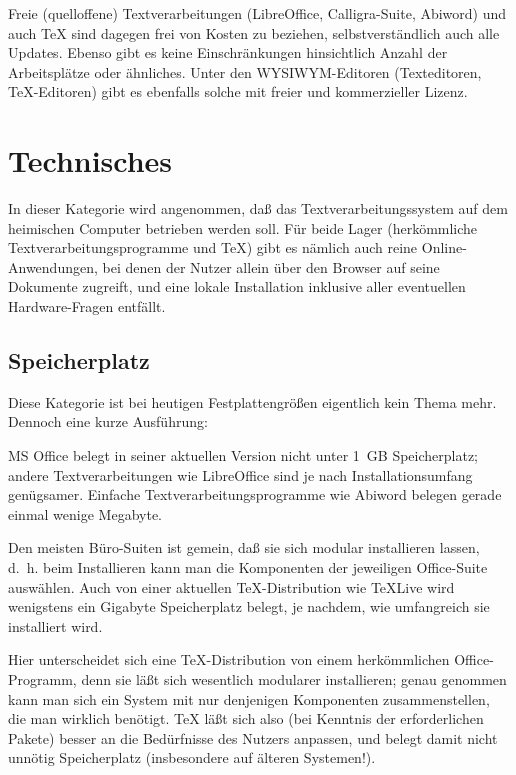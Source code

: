 \documentclass[11pt,a4paper,ngerman,DIV=8]{scrartcl}
\begin{document}
Freie (quelloffene) Textverarbeitungen (LibreOffice, Calligra-Suite, Abiword) und auch \TeX{} sind dagegen frei von Kosten zu beziehen, selbstverständlich auch alle Updates. Ebenso gibt es keine Einschränkungen hinsichtlich Anzahl der Arbeitsplätze oder ähnliches. Unter den WYSIWYM-Editoren (Texteditoren, \TeX{}-Editoren) gibt es ebenfalls solche mit freier und kommerzieller Lizenz.

\section{Technisches}

In dieser Kategorie wird angenommen, daß das Textverarbeitungssystem auf dem heimischen Computer betrieben werden soll. Für beide Lager (herkömmliche Textverarbeitungsprogramme und \TeX{}) gibt es nämlich auch reine Online-Anwendungen, bei denen der Nutzer allein über den Browser auf seine Dokumente zugreift, und eine lokale Installation inklusive aller eventuellen Hardware-Fragen entfällt.

\subsection{Speicherplatz}

Diese Kategorie ist bei heutigen Festplattengrößen eigentlich kein Thema mehr. Dennoch eine kurze Ausführung:

MS Office belegt in seiner aktuellen Version nicht unter 1~GB Speicherplatz; andere Textverarbeitungen wie LibreOffice sind je nach Installationsumfang genügsamer. Einfache Textverarbeitungsprogramme wie Abiword belegen gerade einmal wenige Megabyte.

Den meisten Büro-Suiten ist gemein, daß sie sich modular installieren lassen, d.~h. beim Installieren kann man die Komponenten der jeweiligen Office-Suite auswählen. Auch von einer aktuellen \TeX{}-Distribution wie TeXLive wird wenigstens ein Gigabyte Speicherplatz belegt, je nachdem, wie umfangreich sie installiert wird.

Hier unterscheidet sich eine \TeX{}-Distribution von einem herkömmlichen Office-Programm, denn sie läßt sich wesentlich modularer installieren; genau genommen kann man sich ein System mit nur denjenigen Komponenten zusammenstellen, die man wirklich benötigt. \TeX{} läßt sich also (bei Kenntnis der erforderlichen Pakete) besser an die Bedürfnisse des Nutzers anpassen, und belegt damit nicht unnötig Speicherplatz (insbesondere auf älteren Systemen!).
\end{document}
